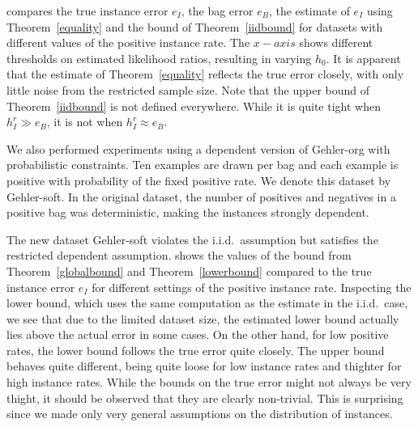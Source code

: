  compares the true instance error $e_I$, the bag error $e_B$, the estimate of $e_I$ using Theorem~\ref{equality}
and the bound of Theorem~\ref{iidbound} for datasets with different values of the positive instance rate.
The $x-axis$ shows different thresholds on estimated likelihood ratios, resulting in varying $h_0$.
It is apparent that the estimate of Theorem~\ref{equality} reflects the true error closely, with only little noise from the restricted
sample size. Note that the upper bound of Theorem~\ref{iidbound} is not defined everywhere. While it is quite tight when
$h_I^r \gg e_B$, it is not when $h_I^r \approx e_B$.


We also performed experiments using a dependent version of Gehler-org
with probabilistic constraints. Ten examples are drawn per bag and each example is positive with probability
of the fixed positive rate. We denote this dataset by Gehler-soft. In the original dataset, the number of positives and negatives in a positive bag
was deterministic, making the instances strongly dependent.

The new dataset Gehler-soft violates the i.i.d.\ assumption but satisfies the
restricted dependent assumption. 
shows the values of the bound from Theorem~\ref{globalbound} and Theorem~\ref{lowerbound} compared to the
true instance error $e_I$ for different settings of the positive instance rate.
Inspecting the lower bound, which uses the same computation as the estimate in the i.i.d.\ case, we see that due to the limited
dataset size, the estimated lower bound actually lies above the actual error in some cases. On the other hand, for low positive
rates, the lower bound follows the true error quite closely.
The upper bound behaves quite different, being quite loose for low instance rates and thighter for high instance rates.
While the bounds on the true error might not always be very thight, it should be observed that they are clearly
non-trivial. This is surprising since we made only very general assumptions on the distribution of instances.

